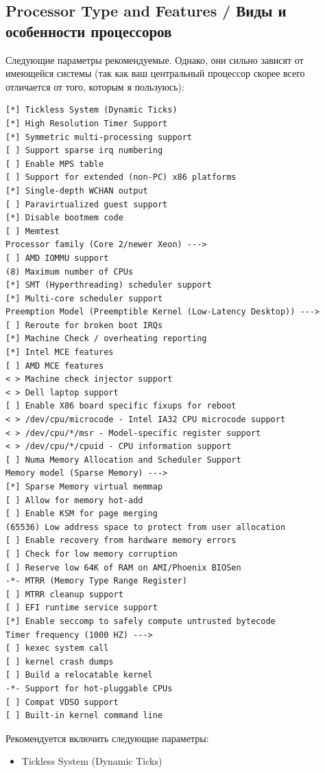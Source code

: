 \documentclass[10pt]{book}
\begin{document}
\subsection{Processor Type and Features / Виды и особенности процессоров}

Следующие параметры рекомендуемые. Однако, они сильно зависят от имеющейся системы (так как ваш центральный процессор скорее всего отличается от того, которым я пользуюсь):

\vspace{3mm}
\begin{tcolorbox}[colback=gray!14!white, colframe=blue!75!blue]
\begin{lstlisting}
[*] Tickless System (Dynamic Ticks)
[*] High Resolution Timer Support
[*] Symmetric multi-processing support
[ ] Support sparse irq numbering
[ ] Enable MPS table
[ ] Support for extended (non-PC) x86 platforms
[*] Single-depth WCHAN output
[ ] Paravirtualized guest support
[*] Disable bootmem code
[ ] Memtest
Processor family (Core 2/newer Xeon) --->
[ ] AMD IOMMU support
(8) Maximum number of CPUs
[*] SMT (Hyperthreading) scheduler support
[*] Multi-core scheduler support
Preemption Model (Preemptible Kernel (Low-Latency Desktop)) --->
[ ] Reroute for broken boot IRQs
[*] Machine Check / overheating reporting
[*] Intel MCE features
[ ] AMD MCE features
< > Machine check injector support
< > Dell laptop support
[ ] Enable X86 board specific fixups for reboot
< > /dev/cpu/microcode - Intel IA32 CPU microcode support
< > /dev/cpu/*/msr - Model-specific register support
< > /dev/cpu/*/cpuid - CPU information support
[ ] Numa Memory Allocation and Scheduler Support
Memory model (Sparse Memory) --->
[*] Sparse Memory virtual memmap
[ ] Allow for memory hot-add
[ ] Enable KSM for page merging
(65536) Low address space to protect from user allocation
[ ] Enable recovery from hardware memory errors
[ ] Check for low memory corruption
[ ] Reserve low 64K of RAM on AMI/Phoenix BIOSen
-*- MTRR (Memory Type Range Register)
[ ] MTRR cleanup support
[ ] EFI runtime service support
[*] Enable seccomp to safely compute untrusted bytecode
Timer frequency (1000 HZ) --->
[ ] kexec system call
[ ] kernel crash dumps
[ ] Build a relocatable kernel
-*- Support for hot-pluggable CPUs
[ ] Compat VDSO support
[ ] Built-in kernel command line
\end{lstlisting}
\end{tcolorbox}

Рекомендуется включить следующие параметры:

\begin{itemize}
\item Tickless System (Dynamic Ticks)
\end{itemize}
\end{document}
